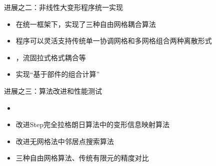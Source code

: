 \documentclass[mathserif]{beamer}
\begin{document}
\begin{CJK}{UTF8}{gkai}
\begin{frame}
\begin{columns}
\begin{column}[pos]{0.6\textwidth}
    			\end{column}
			\end{columns}
		\end{frame}	


        \begin{frame}{进展之二：非线性大变形程序统一实现}
            \begin{itemize}
            \item 在统一框架下，实现了三种自由网格耦合算法
            \item 程序可以灵活支持传统单一协调网格和多网格组合两种离散形式
            \item {，流固拉式格式耦合等}
            \item {\color{red}实现“基于部件的组合计算”}
            \end{itemize}
        \end{frame}
        
        \begin{frame}{进展之三：算法改进和性能测试}
            \begin{itemize}
            \item {}
            \item 改进Step完全拉格朗日算法中的变形信息映射算法
            \item 改进无网格法中邻居点搜索算法
            \item 三种自由网格算法、传统有限元的精度对比
            \end{itemize}
        \end{frame}
 
 
        

\end{CJK}
\end{document}

